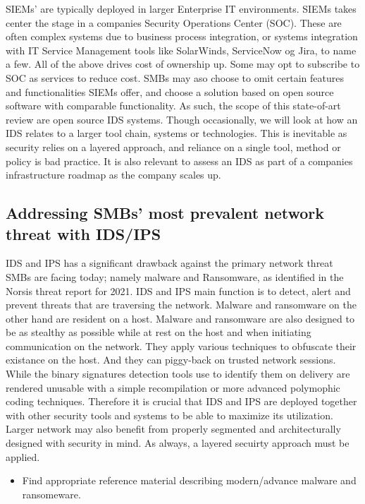 SIEMs' are typically deployed in larger Enterprise IT environments. SIEMs takes center the stage in a companies Security Operations Center (SOC). These are often complex systems due to business process integration, or systems integration with IT Service Management tools like SolarWinds, ServiceNow og Jira, to name a few. All of the above drives cost of ownership up. Some may opt to subscribe to SOC as services to reduce cost. SMBs may aso choose to omit certain features and functionalities SIEMs offer, and choose a solution based on open source software with comparable functionality. As such, the scope of this state-of-art review are open source IDS systems. Though occasionally, we will look at how an IDS relates to a larger tool chain, systems or technologies. This is inevitable as security relies on a layered approach, and reliance on a single tool, method or policy is bad practice. It is also relevant to assess an IDS as part of a companies infrastructure roadmap as the company scales up.

\subsection{Addressing SMBs' most prevalent network threat with IDS/IPS}

IDS and IPS has a significant drawback against the primary network threat SMBs are facing today; namely malware and Ransomware, as identified in the Norsis \cite{Norsis2021} threat report for 2021. IDS and IPS main function is to detect, alert and prevent threats that are traversing the network. Malware and ransomware on the other hand are resident on a host. Malware and ransomware are also designed to be as stealthy as possible while at rest on the host and when initiating communication on the network. They apply various techniques to obfuscate their existance on the host. And they can piggy-back on trusted network sessions. While the binary signatures detection tools use to identify them on delivery are rendered unusable with a simple recompilation or more advanced polymophic coding techniques. Therefore it is crucial that IDS and IPS are deployed together with other security tools and systems to be able to maximize its utilization. Larger network may also benefit from properly segmented and architecturally designed with security in mind. As always, a layered secuirty approach must be applied.

\begin{followup}[to-do]
    \begin{itemize}
        \item Find appropriate reference material describing modern/advance malware and ransomeware.
    \end{itemize}
    
\end{followup}